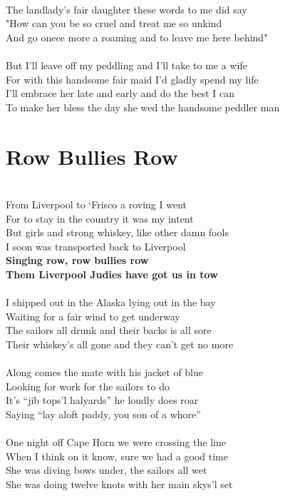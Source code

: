\documentclass[letterpaper,9pt]{article}
\begin{document}
\\The landlady's fair daughter these words to me did say
\\"How can you be so cruel and treat me so unkind
\\And go onece more a roaming and to leave me here behind"
\\
\\But I'll leave off my peddling and I'll take to me a wife
\\For with this handsome fair maid I'd gladly spend my life
\\I'll embrace her late and early and do the best I can
\\To make her bless the day she wed the handsome peddler man


\newpage
\section{Row Bullies Row}
\Large
\noindent
\\From Liverpool to ‘Frisco a roving I went
\\For to stay in the country it was my intent
\\But girls and strong whiskey, like other damn fools
\\I soon was transported back to Liverpool 
\\\textbf{Singing row, row bullies row
\\Them Liverpool Judies have got us in tow}
\\
\\I shipped out in the Alaska lying out in the bay
\\Waiting for a fair wind to get underway
\\The sailors all drunk and their backs is all sore
\\Their whiskey’s all gone and they can’t get no more
\\
\\Along comes the mate with his jacket of blue
\\Looking for work for the sailors to do
\\It’s “jib tops’l halyards” he loudly does roar
\\Saying “lay aloft paddy, you son of a whore”
\\
\\One night off Cape Horn we were crossing the line
\\When I think on it know, sure we had a good time
\\She was diving bows under, the sailors all wet
\\She was doing twelve knots with her main skys’l set
\end{document}
